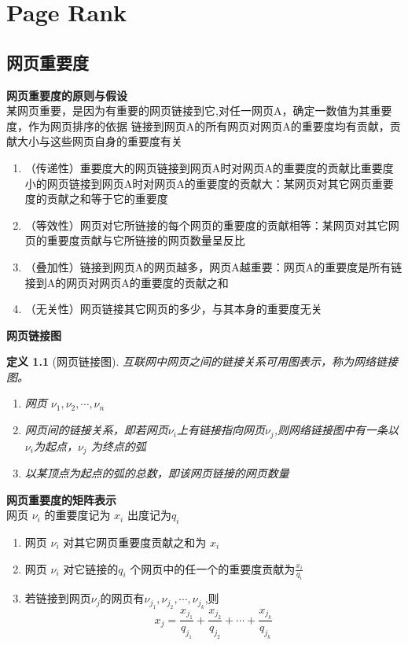 \documentclass[10t, a4paper, oneside]{ctexbook}
\newtheorem{definition}[theorem]{定义}
\begin{document}
\newpage
\chapter{Page Rank}
\section{网页重要度}
\noindent\textbf{网页重要度的原则与假设}\\
某网页重要，是因为有重要的网页链接到它,对任一网页A，确定一数值为其重要度，作为网页排序的依据
链接到网页A的所有网页对网页A的重要度均有贡献，贡献大小与这些网页自身的重要度有关
\begin{enumerate}	
    \item （传递性）重要度大的网页链接到网页A时对网页A的重要度的贡献比重要度小的网页链接到网页A时对网页A的重要度的贡献大：某网页对其它网页重要度的贡献之和等于它的重要度
    \item （等效性）网页对它所链接的每个网页的重要度的贡献相等：某网页对其它网页的重要度贡献与它所链接的网页数量呈反比
    \item （叠加性）链接到网页A的网页越多，网页A越重要：网页A的重要度是所有链接到A的网页对网页A的重要度的贡献之和
    \item （无关性）网页链接其它网页的多少，与其本身的重要度无关
\end{enumerate}	
\noindent\textbf{网页链接图}
\begin{definition}[网页链接图]
    互联网中网页之间的链接关系可用图表示，称为网络链接图。
    \begin{enumerate}
        \item[顶点]网页 $\nu_1,\nu_2,\cdots,\nu_n$ 
        \item[弧]网页间的链接关系，即若网页$\nu_i$上有链接指向网页$\nu_j$,则网络链接图中有一条以$\nu_i$为起点，$\nu_j$ 为终点的弧
        \item[出度]以某顶点为起点的弧的总数，即该网页链接的网页数量
    \end{enumerate}    
\end{definition}
\noindent\textbf{网页重要度的矩阵表示}\\
网页 $\nu_i$ 的重要度记为 $x_i$ 出度记为$q_i$
\begin{enumerate}
    \item[传递性]网页 $\nu_i$ 对其它网页重要度贡献之和为 $x_i$
    \item[等效性]网页 $\nu_i$ 对它链接的$q_i$ 个网页中的任一个的重要度贡献为$\frac{x_i}{q_i}$
    \item[叠加性]若链接到网页$\nu_j$的网页有$\nu_{j_1},\nu_{j_2},\cdots,\nu_{j_k}$,则
        $$x_j=\frac{x_{j_1}}{q_{j_1}}+\frac{x_{j_2}}{q_{j_2}}+\cdots+\frac{x_{j_k}}{q_{j_k}}$$
\end{enumerate} 
\end{document}
